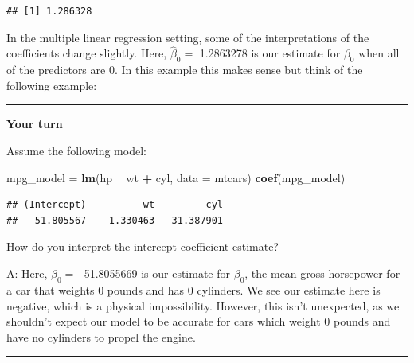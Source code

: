 \documentclass[]{book}
\newenvironment{Shaded}{\begin{snugshade}}{\end{snugshade}}
\newcommand{\DataTypeTok}[1]{\textcolor[rgb]{0.13,0.29,0.53}{#1}}
\newcommand{\KeywordTok}[1]{\textcolor[rgb]{0.13,0.29,0.53}{\textbf{#1}}}
\newcommand{\NormalTok}[1]{#1}
\newcommand{\OperatorTok}[1]{\textcolor[rgb]{0.81,0.36,0.00}{\textbf{#1}}}
\newcommand{\StringTok}[1]{\textcolor[rgb]{0.31,0.60,0.02}{#1}}
\begin{document}
\begin{verbatim}
## [1] 1.286328
\end{verbatim}

In the multiple linear regression setting, some of the interpretations
of the coefficients change slightly. Here, \(\hat\beta_{0} =\) 1.2863278
is our estimate for \(\beta_{0}\) when all of the predictors are 0. In
this example this makes sense but think of the following example:

\begin{center}\rule{0.5\linewidth}{\linethickness}\end{center}

\textbf{Your turn}

Assume the following model:

\begin{Shaded}
\begin{Highlighting}[]
\NormalTok{mpg_model =}\StringTok{ }\KeywordTok{lm}\NormalTok{(hp }\OperatorTok{~}\StringTok{ }\NormalTok{wt }\OperatorTok{+}\StringTok{ }\NormalTok{cyl, }\DataTypeTok{data =}\NormalTok{ mtcars)}
\KeywordTok{coef}\NormalTok{(mpg_model)}
\end{Highlighting}
\end{Shaded}

\begin{verbatim}
## (Intercept)          wt         cyl 
##  -51.805567    1.330463   31.387901
\end{verbatim}

How do you interpret the intercept coefficient estimate?

A: Here, \(\hat\beta_{0} =\) -51.8055669 is our estimate for
\(\beta_{0}\), the mean gross horsepower for a car that weights 0 pounds
and has 0 cylinders. We see our estimate here is negative, which is a
physical impossibility. However, this isn't unexpected, as we shouldn't
expect our model to be accurate for cars which weight 0 pounds and have
no cylinders to propel the engine.

\begin{center}\rule{0.5\linewidth}{\linethickness}\end{center}
\end{document}
